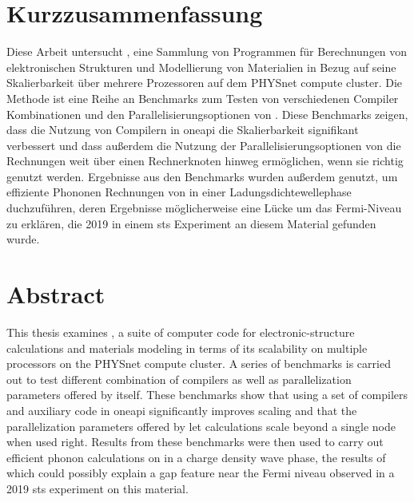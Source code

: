 \documentclass[main.tex]{subfiles}
\begin{document}
\section*{Kurzzusammenfassung}

Diese Arbeit untersucht \QE, eine Sammlung von Programmen für Berechnungen von elektronischen Strukturen und Modellierung von Materialien in Bezug auf seine Skalierbarkeit über mehrere Prozessoren auf dem PHYSnet compute cluster.
Die Methode ist eine Reihe an Benchmarks zum Testen von verschiedenen Compiler Kombinationen und den Parallelisierungsoptionen von \QE.
Diese Benchmarks zeigen, dass die Nutzung von Compilern in \gls{oneapi} die Skalierbarkeit signifikant verbessert und dass außerdem die Nutzung der Parallelisierungsoptionen von \QE die Rechnungen weit über einen Rechnerknoten hinweg ermöglichen, wenn sie richtig genutzt werden.
Ergebnisse aus den Benchmarks wurden außerdem genutzt, um effiziente Phononen Rechnungen von \TaS in einer Ladungsdichtewellephase duchzuführen, deren Ergebnisse möglicherweise eine Lücke um das Fermi-Niveau zu erklären, die 2019 in einem \gls{sts} Experiment an diesem Material gefunden wurde.

\section*{Abstract}

This thesis examines \QE, a suite of computer code for electronic-structure calculations and materials modeling in terms of its scalability on multiple processors on the PHYSnet compute cluster.
A series of benchmarks is carried out to test different combination of compilers as well as parallelization parameters offered by \QE itself.
These benchmarks show that using a set of compilers and auxiliary code in \gls{oneapi} significantly improves scaling and that the parallelization parameters offered by \QE let calculations scale beyond a single node when used right.
Results from these benchmarks were then used to carry out efficient phonon calculations on \TaS in a charge density wave phase, the results of which could possibly explain a gap feature near the Fermi niveau observed in a 2019 \gls{sts} experiment on this material.
\end{document}
